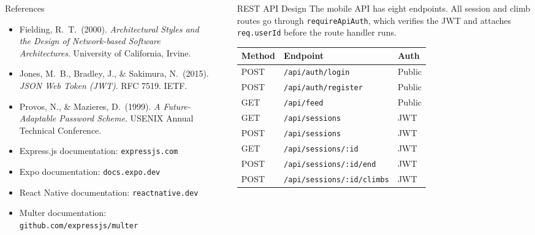 \documentclass[final]{beamer}
\newlength{\sepwidth}
\newlength{\colwidth}
\newcommand{\separatorcolumn}{\begin{column}{\sepwidth}\end{column}}
\begin{document}
\begin{frame}[t,fragile]
\begin{columns}[t]
\begin{column}{\colwidth}
  \begin{block}{References}
    \footnotesize
    \begin{itemize}\setlength\itemsep{0pt}
      \item Fielding, R.\ T.\ (2000). \textit{Architectural Styles and the Design of Network-based Software Architectures}. University of California, Irvine.
      \item Jones, M.\ B., Bradley, J., \& Sakimura, N.\ (2015). \textit{JSON Web Token (JWT)}. RFC 7519. IETF.
      \item Provos, N., \& Mazieres, D.\ (1999). \textit{A Future-Adaptable Password Scheme}. USENIX Annual Technical Conference.
      \item Express.js documentation: \texttt{expressjs.com}
      \item Expo documentation: \texttt{docs.expo.dev}
      \item React Native documentation: \texttt{reactnative.dev}
      \item Multer documentation: \texttt{github.com/expressjs/multer}
    \end{itemize}
  \end{block}

\end{column}

\separatorcolumn

\begin{column}{\colwidth}

  \begin{block}{REST API Design}
    The mobile API has eight endpoints. All session and climb routes go
    through \texttt{requireApiAuth}, which verifies the JWT and attaches
    \texttt{req.userId} before the route handler runs.

    \vspace{0.1cm}
    \begin{center}
    \begin{tabular}{lll}
    \toprule
    \textbf{Method} & \textbf{Endpoint} & \textbf{Auth} \\
    \midrule
    POST & \texttt{/api/auth/login}        & Public \\
    POST & \texttt{/api/auth/register}     & Public \\
    GET  & \texttt{/api/feed}              & Public \\
    GET  & \texttt{/api/sessions}          & JWT \\
    POST & \texttt{/api/sessions}          & JWT \\
    GET  & \texttt{/api/sessions/:id}      & JWT \\
    POST & \texttt{/api/sessions/:id/end}  & JWT \\
    POST & \texttt{/api/sessions/:id/climbs} & JWT \\
    \bottomrule
    \end{tabular}
    \end{center}


\end{block}
\end{column}
\end{columns}
\end{frame}
\end{document}
